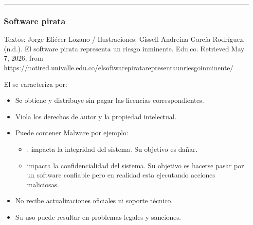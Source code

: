 \documentclass[letterpaper,10pt,spanish]{sphinxmanual}
\begin{document}
\bigskip\hrule\bigskip



\subsubsection{Software pirata}
\label{\detokenize{1_guias/10ofimatica/G1012:software-pirata}}\begin{quote}

\sphinxAtStartPar
{}
\end{quote}

\sphinxAtStartPar
%
\begin{footnote}[15]\sphinxAtStartFootnote
Textos: Jorge Eliécer Lozano / Ilustraciones: Gissell Andreína García Rodríguez. (n.d.). El software pirata representa un riesgo inminente. Edu.co. Retrieved May 7, 2026, from https://notired.univalle.edu.co/el\sphinxhyphen{}software\sphinxhyphen{}pirata\sphinxhyphen{}representa\sphinxhyphen{}un\sphinxhyphen{}riesgo\sphinxhyphen{}inminente/
%
\end{footnote} El  se caracteriza por:
\begin{itemize}
\item {} 
\sphinxAtStartPar
Se obtiene y distribuye sin pagar las licencias correspondientes.

\item {} 
\sphinxAtStartPar
Viola los derechos de autor y la propiedad intelectual.

\item {} 
\sphinxAtStartPar
Puede contener Malware por ejemplo:
\begin{itemize}
\item {} 
\sphinxAtStartPar
{}: impacta la integridad del sistema. Su objetivo es dañar.

\item {} 
\sphinxAtStartPar
{} impacta la confidencialidad del sistema. Su objetivo es hacerse pasar por un software confiable pero en realidad esta ejecutando acciones maliciosas.

\end{itemize}

\item {} 
\sphinxAtStartPar
No recibe actualizaciones oficiales ni soporte técnico.

\item {} 
\sphinxAtStartPar
Su uso puede resultar en problemas legales y sanciones.

\end{itemize}
\end{document}
